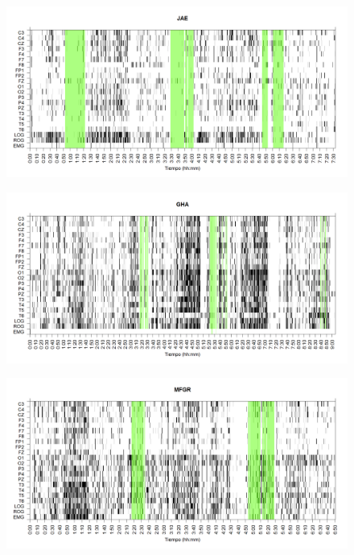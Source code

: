 \documentclass[12pt,a4paper]{mitthesis}
\begin{document}
\begin{figure}
\centering
\includegraphics[width=0.9\linewidth]
{./g170413/JANASUE_est.png} 
\label{grf_JAE}
\end{figure}

\begin{figure}
\centering
\includegraphics[width=0.9\linewidth]
{./g170413/GH24031950SUENNO_est.png} 
\label{grf_GHA}
\end{figure}

\begin{figure}
\centering
\includegraphics[width=0.9\linewidth]
{./g170413/GURM251148SUE_est.png} 
\label{grf_MFGR}
\end{figure}

\end{document}
